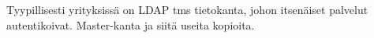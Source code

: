 Tyypillisesti yrityksissä on LDAP tms tietokanta, johon itsenäiset palvelut autentikoivat. Master-kanta ja siitä useita kopioita.
